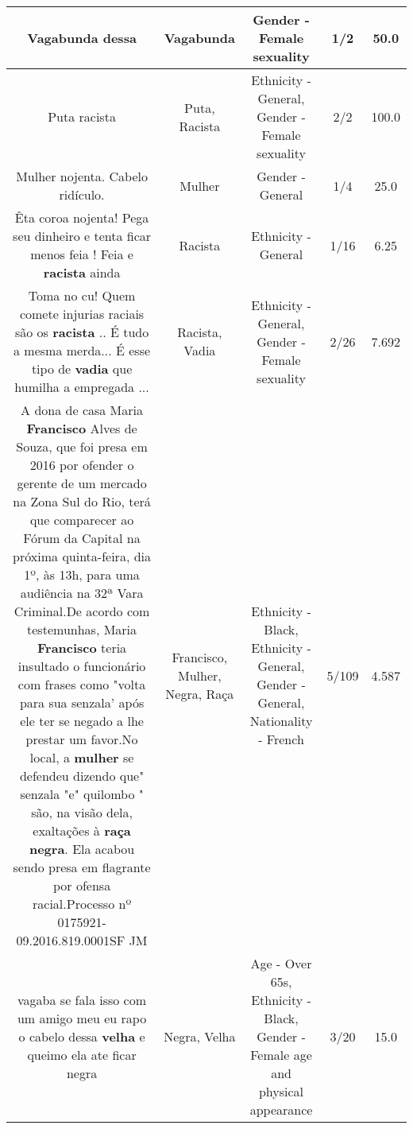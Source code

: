 \documentclass[11pt]{article}
\newlength\mylength
\begin{document}
\begin{center}
\begin{longtable}{|C{.65\mylength}|C{.30\mylength}|C{.12\mylength}|C{.12\mylength}|C{.12\mylength}|}
  \small Vagabunda dessa\normalsize   & Vagabunda & Gender - Female sexuality & 1/2 & 50.0 \\  \hline
  \small Puta racista\normalsize   & Puta, Racista & Ethnicity - General, Gender - Female sexuality & 2/2 & 100.0 \\  \hline
  \small Mulher nojenta. Cabelo ridículo.\normalsize   & Mulher & Gender - General & 1/4 & 25.0 \\  \hline
  \small Êta coroa nojenta! Pega seu dinheiro e tenta ficar menos feia ! Feia e \textbf{racista} ainda\normalsize   & Racista & Ethnicity - General & 1/16 & 6.25 \\  \hline
  \small Toma no cu! Quem comete injurias raciais são os \textbf{racista} .. É tudo a mesma merda... É esse tipo de \textbf{vadia} que humilha a empregada ...\normalsize   & Racista, Vadia & Ethnicity - General, Gender - Female sexuality & 2/26 & 7.692 \\  \hline
  \small A dona de casa Maria \textbf{Francisco} Alves de Souza, que foi presa em 2016 por ofender o gerente de um mercado na Zona Sul do Rio, terá que comparecer ao Fórum da Capital na próxima quinta-feira, dia 1º, às 13h, para uma audiência na 32ª Vara Criminal.De acordo com testemunhas, Maria \textbf{Francisco} teria insultado o funcionário com frases como "volta para sua senzala' após ele ter se negado a lhe prestar um favor.No local, a \textbf{mulher} se defendeu dizendo que" senzala "e" quilombo " são, na visão dela, exaltações à \textbf{raça} \textbf{negra}. Ela acabou sendo presa em flagrante por ofensa racial.Processo nº 0175921-09.2016.819.0001SF  JM\normalsize   & Francisco, Mulher, Negra, Raça & Ethnicity - Black, Ethnicity - General, Gender - General, Nationality - French & 5/109 & 4.587 \\  \hline
  \small vagaba se fala isso com um amigo meu eu rapo o cabelo dessa \textbf{v\textbf{elha}} e queimo ela  ate ficar negra\normalsize   & Negra, Velha & Age - Over 65s, Ethnicity - Black, Gender - Female age and physical appearance & 3/20 & 15.0 \\  \hline

\end{longtable}
\end{center}
\end{document}
